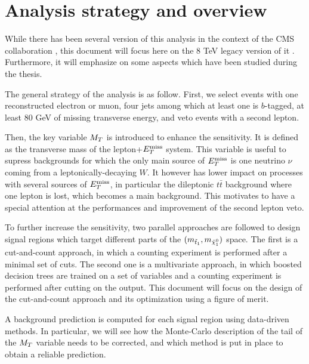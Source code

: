     \section{Analysis strategy and overview}
   
    While there has been several version of this analysis in the context of the CMS 
    collaboration \cite{SUS-12-023-PAS, SUS-13-011-PUB, SUS-14-015-PAS}, this document 
    will focus here on the 8 TeV legacy version of it \cite{SUS-14-015-PAS}. Furthermore, 
    it will emphasize on some aspects which have been studied during the thesis.

    The general strategy of the analysis is as follow. First, we select events with one 
    reconstructed electron or muon, four jets among which at least one is $b$-tagged, 
    at least 80 GeV of missing transverse energy, and veto events with a second lepton. 

    Then, the key variable $M_T$ is introduced to enhance the sensitivity. It is defined as 
    the transverse mass of the lepton+$E_T^\text{miss}$ system. This variable is useful to supress
    backgrounds for which the only main source of $E_T^\text{miss}$ is one neutrino $\nu$ 
    coming from a leptonically-decaying $W$. It however has lower impact on processes with 
    several sources of $E_T^\text{miss}$, in particular the dileptonic $t\bar{t}$ background where one 
    lepton is lost, which becomes a main background. This motivates to have a special
    attention at the performances and improvement of the second lepton veto.

    To further increase the sensitivity, two parallel approaches are followed to design 
    signal regions which target different parts of the $(m_{\tilde{t}_1},m_{\tilde{\chi}_1^0})$
    space. The first is a cut-and-count approach, in which a counting experiment is performed 
    after a minimal set of cuts. The second one is a multivariate approach, in which boosted 
    decision trees are trained on a set of variables and a counting experiment is performed 
    after cutting on the output. This document will focus on the design of the cut-and-count
    approach and its optimization using a figure of merit.

    A background prediction is computed for each signal region using data-driven methods.
    In particular, we will see how the Monte-Carlo description of the tail of the $M_T$ 
    variable needs to be corrected, and which method is put in place to obtain a reliable 
    prediction.

